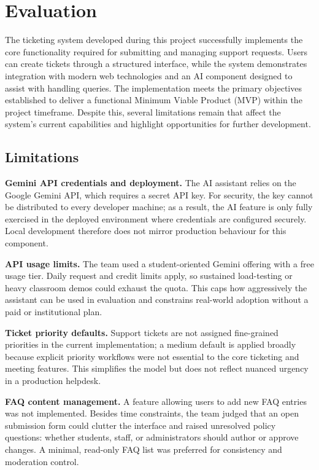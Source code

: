 \chapter{Evaluation}
\label{chap:evaluation}
The ticketing system developed during this project successfully implements the core functionality required for submitting and managing support requests. Users can create tickets through a structured interface, while the system demonstrates integration with modern web technologies and an AI component designed to assist with handling queries. The implementation meets the primary objectives established to deliver a functional Minimum Viable Product (MVP) within the project timeframe. Despite this, several limitations remain that affect the system’s current capabilities and highlight opportunities for further development.

\section{Limitations}

\textbf{Gemini API credentials and deployment.} The AI assistant relies on the Google Gemini API, which requires a secret API key. For security, the key cannot be distributed to every developer machine; as a result, the AI feature is only fully exercised in the deployed environment where credentials are configured securely. Local development therefore does not mirror production behaviour for this component.

\textbf{API usage limits.} The team used a student-oriented Gemini offering with a free usage tier. Daily request and credit limits apply, so sustained load-testing or heavy classroom demos could exhaust the quota. This caps how aggressively the assistant can be used in evaluation and constrains real-world adoption without a paid or institutional plan.

\textbf{Ticket priority defaults.} Support tickets are not assigned fine-grained priorities in the current implementation; a medium default is applied broadly because explicit priority workflows were not essential to the core ticketing and meeting features. This simplifies the model but does not reflect nuanced urgency in a production helpdesk.

\textbf{FAQ content management.} A feature allowing users to add new FAQ entries was not implemented. Besides time constraints, the team judged that an open submission form could clutter the interface and raised unresolved policy questions: whether students, staff, or administrators should author or approve changes. A minimal, read-only FAQ list was preferred for consistency and moderation control.

